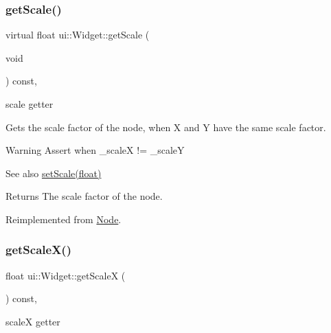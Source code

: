 \subsubsection{\texorpdfstring{get\+Scale()}{getScale()}\hspace{0.1cm}{\footnotesize\ttfamily [2/2]}}
{\footnotesize\ttfamily virtual float ui\+::\+Widget\+::get\+Scale (\begin{DoxyParamCaption}\item[{void}]{ }\end{DoxyParamCaption}) const\hspace{0.3cm}{\ttfamily [override]}, {\ttfamily [virtual]}}



scale getter 

Gets the scale factor of the node, when X and Y have the same scale factor.

\begin{DoxyWarning}{Warning}
Assert when {\ttfamily \+\_\+scaleX != \+\_\+scaleY} 
\end{DoxyWarning}
\begin{DoxySeeAlso}{See also}
\hyperlink{classui_1_1Widget_a811bffaa1d3bae377c00a15edccb396f}{set\+Scale(float)}
\end{DoxySeeAlso}
\begin{DoxyReturn}{Returns}
The scale factor of the node. 
\end{DoxyReturn}


Reimplemented from \hyperlink{classNode_ac9926440d4edab1020d348a2b950307c}{Node}.

\mbox{\label{classui_1_1Widget_aca37ca371fdab9dc91dc554740b37e11}} 
\subsubsection{\texorpdfstring{get\+Scale\+X()}{getScaleX()}\hspace{0.1cm}{\footnotesize\ttfamily [1/2]}}
{\footnotesize\ttfamily float ui\+::\+Widget\+::get\+ScaleX (\begin{DoxyParamCaption}{ }\end{DoxyParamCaption}) const\hspace{0.3cm}{\ttfamily [override]}, {\ttfamily [virtual]}}



scaleX getter 

